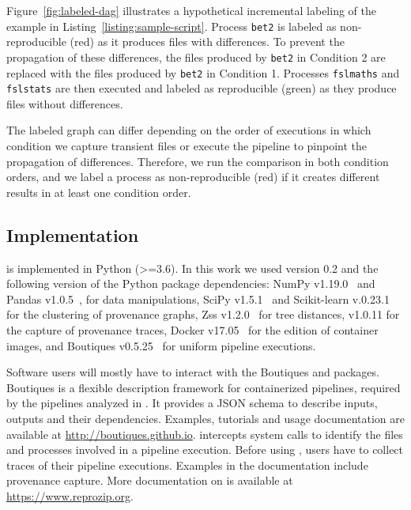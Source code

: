 Figure~\ref{fig:labeled-dag} illustrates a hypothetical incremental
labeling of the example in Listing~\ref{listing:sample-script}. Process
\texttt{bet2} is labeled as non-reproducible (red) as it produces files
with differences. To prevent the propagation of these differences, the
files produced by \texttt{bet2} in Condition 2 are replaced with the
files produced by \texttt{bet2} in Condition 1. Processes
\texttt{fslmaths} and \texttt{fslstats} are then executed and
labeled as reproducible (green) as they produce files without differences.

The labeled graph can differ depending on the order of executions in which condition we capture transient files 
or execute the pipeline to pinpoint the propagation of differences. Therefore, we run the comparison in both condition orders, 
and we label a process as non-reproducible (red) if it creates different results in at least one condition order.

\subsection{Implementation}
\toolname is implemented in Python (>=3.6). In this work we used \toolname version 0.2 and the following version of
the Python package dependencies: NumPy v1.19.0~\cite{oliphant2006guide} and Pandas v1.0.5~\cite{mckinney2011pandas},
for data manipulations, SciPy v1.5.1~\cite{2020SciPy-NMeth} and Scikit-learn v.0.23.1~\cite{pedregosa2011scikit}
for the clustering of provenance graphs, Zss v1.2.0~\cite{zhang1989simple} for tree distances,
\reprozip v1.0.11 for the capture of provenance traces, Docker v17.05~\cite{merkel2014docker} for
the edition of container images, and Boutiques v0.5.25~\cite{glatard2018boutiques} for uniform pipeline executions.

Software users will mostly have to interact with the Boutiques and \reprozip packages.
Boutiques is a flexible description framework for containerized pipelines, required by
the pipelines analyzed in \toolname. It provides a JSON schema to describe inputs, outputs and their dependencies.
Examples, tutorials and usage documentation are available at \url{http://boutiques.github.io}. \reprozip intercepts
system calls to identify the files and processes involved in a pipeline execution.
Before using \toolname, users have to collect \reprozip traces of their pipeline executions.
Examples in the \toolname documentation include \reprozip provenance capture.
More documentation on \reprozip is available at \url{https://www.reprozip.org}.

